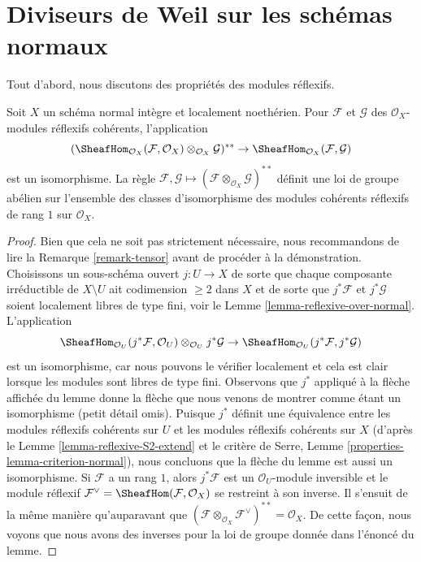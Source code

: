 \section{Diviseurs de Weil sur les schémas normaux}
\label{section-weil-divisors-normal}

\noindent
Tout d'abord, nous discutons des propriétés des modules réflexifs.

\begin{lemma}
\label{lemma-reflexive-normal}
Soit  $X$  un schéma normal intègre et localement noethérien. Pour
 $\mathcal{F}$  et  $\mathcal{G}$  des  $\mathcal{O}_X$-modules réflexifs cohérents,
l'application
$$
(\SheafHom_{\mathcal{O}_X}(\mathcal{F}, \mathcal{O}_X)
\otimes_{\mathcal{O}_X} \mathcal{G})^{**} \to
\SheafHom_{\mathcal{O}_X}(\mathcal{F}, \mathcal{G})
$$
est un isomorphisme. La règle  $\mathcal{F}, \mathcal{G} \mapsto
(\mathcal{F} \otimes_{\mathcal{O}_X} \mathcal{G})^{**}$  définit une loi de groupe abélien sur
l'ensemble des classes d'isomorphisme des modules cohérents réflexifs de rang  $1$
sur  $\mathcal{O}_X$.
\end{lemma}

\begin{proof}
Bien que cela ne soit pas strictement nécessaire, nous recommandons de lire la
Remarque  \ref{remark-tensor}  avant de procéder à la démonstration. Choisissons un
sous-schéma ouvert  $j : U \to X$  de sorte que chaque composante irréductible de
 $X \setminus U$  ait codimension  $\geq 2$  dans  $X$  et de sorte que
 $j^*\mathcal{F}$  et  $j^*\mathcal{G}$  soient localement libres de type fini, voir le Lemme
 \ref{lemma-reflexive-over-normal}. L'application
$$
\SheafHom_{\mathcal{O}_U}(j^*\mathcal{F}, \mathcal{O}_U)
\otimes_{\mathcal{O}_U} j^*\mathcal{G} \to
\SheafHom_{\mathcal{O}_U}(j^*\mathcal{F}, j^*\mathcal{G})
$$
est un isomorphisme, car nous pouvons le vérifier localement et cela est clair
lorsque les modules sont libres de type fini. Observons que  $j^*$  appliqué à
la flèche affichée du lemme donne la flèche que nous venons de montrer comme étant
un isomorphisme (petit détail omis). Puisque  $j^*$  définit une équivalence
entre les modules réflexifs cohérents sur  $U$  et les modules réflexifs
cohérents sur  $X$  (d'après le Lemme  \ref{lemma-reflexive-S2-extend}  et le critère de Serre,
Lemme  \ref{properties-lemma-criterion-normal}), nous concluons que la flèche du lemme est aussi un
isomorphisme. Si  $\mathcal{F}$  a un rang  $1$, alors  $j^*\mathcal{F}$  est un
 $\mathcal{O}_U$-module inversible et le module réflexif  $\mathcal{F}^\vee = \SheafHom(\mathcal{F}, \mathcal{O}_X)$  se restreint à
son inverse. Il s'ensuit de la même manière qu'auparavant que  $(\mathcal{F} \otimes_{\mathcal{O}_X} \mathcal{F}^\vee)^{**} = \mathcal{O}_X$. De
cette façon, nous voyons que nous avons des inverses pour la loi de groupe donnée
dans l'énoncé du lemme.
\end{proof}

